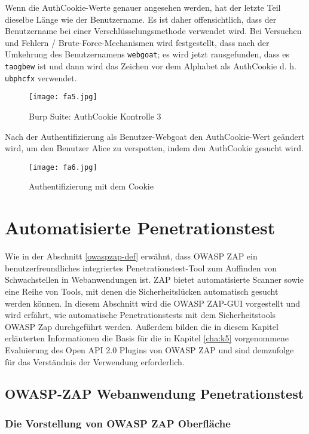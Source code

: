 Wenn die AuthCookie-Werte genauer angesehen werden, hat der letzte Teil dieselbe Länge wie der Benutzername. Es ist daher offensichtlich, dass der Benutzername bei einer Verschlüsselungsmethode verwendet wird. Bei Versuchen und Fehlern / Brute-Force-Mechanismen wird festgestellt, dass nach der Umkehrung des Benutzernamens \texttt{webgoat}; es wird jetzt rausgefunden, dass es \texttt{taogbew} ist und dann wird das Zeichen vor dem Alphabet als AuthCookie d. h. \texttt{ubphcfx} verwendet.

\newpage

\begin{figure}[h]
	\centering
	\texttt{[image: fa5.jpg]}
	\caption{Burp Suite: AuthCookie Kontrolle 3}
\end{figure}

Nach der Authentifizierung als Benutzer-Webgoat den AuthCookie-Wert geändert wird, um den Benutzer Alice zu verspotten, indem den AuthCookie gesucht wird.

\begin{figure}[h]
	\centering
	\texttt{[image: fa6.jpg]}
	\caption{Authentifizierung mit dem Cookie}
\end{figure}

\section{Automatisierte Penetrationstest}

Wie in der Abschnitt \ref{owaspzap-def} erwähnt, dass OWASP ZAP ein benutzerfreundliches integriertes Penetrationstest-Tool zum Auffinden von Schwachstellen in Webanwendungen ist. ZAP bietet automatisierte Scanner sowie eine Reihe von Tools, mit denen die Sicherheitslücken automatisch gesucht werden können. In diesem Abschnitt wird die OWASP ZAP-GUI vorgestellt und wird erfährt, wie automatische Penetrationstests mit dem Sicherheitstools OWASP Zap durchgeführt werden. Außerdem bilden die in diesem Kapitel erläuterten Informationen die Basis für die in Kapitel \ref{cha:k5} vorgenommene Evaluierung des Open API 2.0 Plugins von OWASP ZAP und sind demzufolge für das Verständnis der Verwendung erforderlich.

\subsection{OWASP-ZAP Webanwendung Penetrationstest}

\subsubsection{Die Vorstellung von OWASP ZAP Oberfläche}

